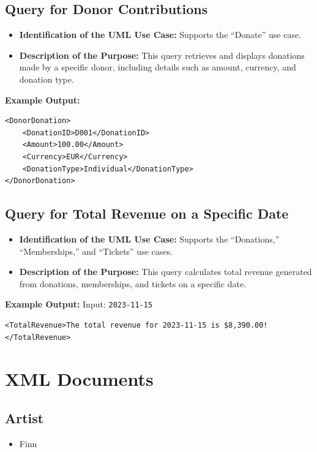 \documentclass{article} %
\begin{document}
\subsection{Query for Donor Contributions}
\begin{itemize}
    \item \textbf{Identification of the UML Use Case:} Supports the ``Donate'' use case.
    \item \textbf{Description of the Purpose:} This query retrieves and displays donations made by a specific donor, including details such as amount, currency, and donation type.
\end{itemize}

\textbf{Example Output:}
\begin{verbatim}
<DonorDonation>
    <DonationID>D001</DonationID>
    <Amount>100.00</Amount>
    <Currency>EUR</Currency>
    <DonationType>Individual</DonationType>
</DonorDonation>
\end{verbatim}

\subsection{Query for Total Revenue on a Specific Date}
\begin{itemize}
    \item \textbf{Identification of the UML Use Case:} Supports the ``Donations,'' ``Memberships,'' and ``Tickets'' use cases.
    \item \textbf{Description of the Purpose:} This query calculates total revenue generated from donations, memberships, and tickets on a specific date.
\end{itemize}

\textbf{Example Output:}  
Input: \texttt{2023-11-15}  
\begin{verbatim}
<TotalRevenue>The total revenue for 2023-11-15 is $8,390.00!</TotalRevenue>
\end{verbatim}

\newpage
\section{XML Documents}

\subsection{Artist}

\begin{itemize}
    \item Finn
\end{itemize}
\end{document}
